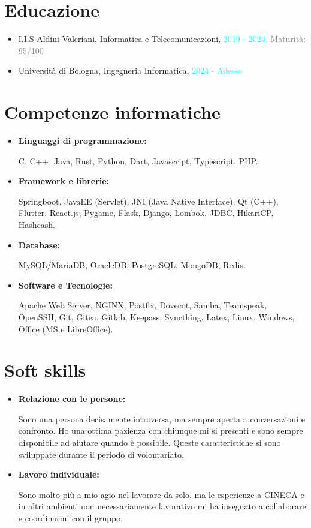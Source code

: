 \documentclass{paper}
\begin{document}
\section{Educazione}

\begin{itemize}
    \item I.I.S Aldini Valeriani,
    Informatica e Telecomunicazioni,
    \textcolor{cyan}{2019 - 2024,}
    \textcolor{gray}{Maturità: 95/100}

    \item Università di Bologna,
    Ingegneria Informatica,
    \textcolor{cyan}{2024 - Adesso}
\end{itemize}

\section{Competenze informatiche}

\begin{itemize}
    \item \textbf{Linguaggi di programmazione:}
    
    C, C++, Java, Rust, Python, Dart, Javascript,
    Typescript, PHP.

    \item \textbf{Framework e librerie:}
    
    Springboot, JavaEE (Servlet),
    JNI (Java Native Interface), Qt (C++), Flutter,
    React.js, Pygame, Flask, Django, Lombok, JDBC,
    HikariCP, Hashcash.

    \item \textbf{Database:}
    
    MySQL/MariaDB, OracleDB, PostgreSQL, MongoDB, Redis.

    \item \textbf{Software e Tecnologie:}
    
    Apache Web Server, NGINX, Postfix, Dovecot, Samba,
    Teamspeak, OpenSSH, Git, Gitea, Gitlab, Keepass,
    Syncthing, Latex, Linux, Windows, Office (MS e LibreOffice).
\end{itemize}

\section{Soft skills}

\begin{itemize}
    \item \textbf{Relazione con le persone:}
    
    Sono una persona decisamente introversa,
    ma sempre aperta a conversazioni e confronto.
    Ho una ottima pazienza con chiunque mi si presenti
    e sono sempre disponibile ad aiutare quando è possibile.
    Queste caratteristiche si sono sviluppate durante
    il periodo di volontariato.

    \item \textbf{Lavoro individuale:}
    
    Sono molto più a mio agio nel lavorare da solo,
    ma le esperienze a CINECA e in altri ambienti non
    necessariamente lavorativo mi ha insegnato a
    collaborare e coordinarmi con il gruppo.
\end{itemize}
\end{document}
